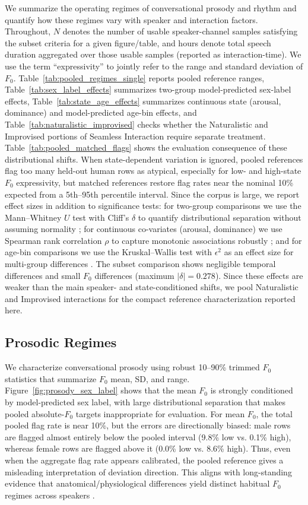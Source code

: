 \documentclass[conference]{IEEEtran}
\begin{document}
We summarize the operating regimes of conversational prosody and rhythm and quantify how these regimes vary with speaker and interaction factors.
Throughout, $N$ denotes the number of usable speaker-channel samples satisfying the subset criteria for a given figure/table, and hours denote total speech duration aggregated over those usable samples (reported as interaction-time). 
We use the term ``expressivity'' to jointly refer to the range and standard deviation of $F_0$.
Table~\ref{tab:pooled_regimes_single} reports pooled reference ranges, Table~\ref{tab:sex_label_effects} summarizes two-group model-predicted sex-label effects, Table~\ref{tab:state_age_effects} summarizes continuous state (arousal, dominance) and model-predicted age-bin effects, and Table~\ref{tab:naturalistic_improvised} checks whether the Naturalistic and Improvised portions of Seamless Interaction require separate treatment. 
Table~\ref{tab:pooled_matched_flags} shows the evaluation consequence of these distributional shifts. When state-dependent variation is ignored, pooled references flag too many held-out human rows as atypical, especially for low- and high-state $F_0$ expressivity, but matched references restore flag rates near the nominal 10\% expected from a 5th--95th percentile interval. 
Since the corpus is large, we report effect sizes in addition to significance tests: for two-group comparisons we use the Mann--Whitney $U$ test with Cliff's $\delta$ to quantify distributional separation without assuming normality \cite{cliff1993dominance}; for continuous co-variates (arousal, dominance) we use Spearman rank correlation $\rho$ to capture monotonic associations robustly \cite{spearman1961proof}; and for age-bin comparisons we use the Kruskal--Wallis test with $\epsilon^2$ as an effect size for multi-group differences \cite{kruskal1952use, tomczak2014need}. 
The subset comparison shows negligible temporal differences and small $F_0$ differences (maximum $|\delta|=0.278$). Since these effects are weaker than the main speaker- and state-conditioned shifts, we pool Naturalistic and Improvised interactions for the compact reference characterization reported here.

\subsection{Prosodic Regimes}
We characterize conversational prosody using robust 10--90\% trimmed $F_0$ statistics that summarize $F_0$ mean, SD, and range.
Figure~\ref{fig:prosody_sex_label} shows that the mean $F_0$ is strongly conditioned by model-predicted sex label, with large distributional separation that makes pooled absolute-$F_0$ targets inappropriate for evaluation. 
For mean $F_0$, the total pooled flag rate is near 10\%, but the errors are directionally biased: male rows are flagged almost entirely below the pooled interval (9.8\% low vs. 0.1\% high), whereas female rows are flagged above it (0.0\% low vs. 8.6\% high). Thus, even when the aggregate flag rate appears calibrated, the pooled reference gives a misleading interpretation of deviation direction. 
This aligns with long-standing evidence that anatomical/physiological differences yield distinct habitual $F_0$ regimes across speakers \cite{traunmuller_acoustic_2000, titze_toward_1994}.
\end{document}
